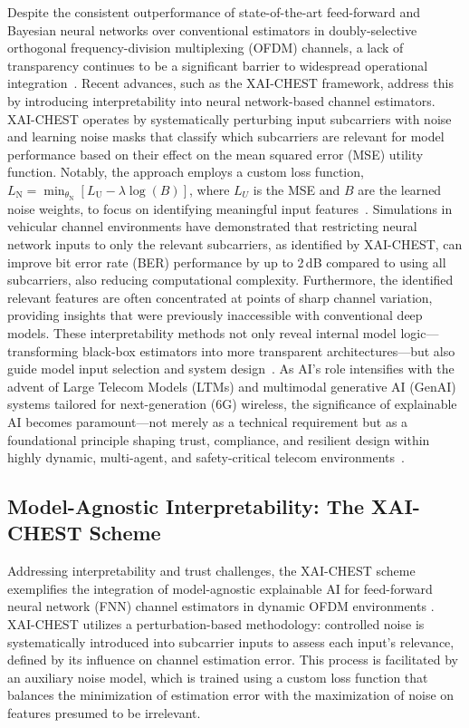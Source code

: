 \documentclass[sigconf]{acmart}
\begin{document}
Despite the consistent outperformance of state-of-the-art feed-forward and Bayesian neural networks over conventional estimators in doubly-selective orthogonal frequency-division multiplexing (OFDM) channels, a lack of transparency continues to be a significant barrier to widespread operational integration~\cite{ref38}. Recent advances, such as the XAI-CHEST framework, address this by introducing interpretability into neural network-based channel estimators. XAI-CHEST operates by systematically perturbing input subcarriers with noise and learning noise masks that classify which subcarriers are relevant for model performance based on their effect on the mean squared error (MSE) utility function. Notably, the approach employs a custom loss function, $L_\mathrm{N} = \min_{\theta_\mathrm{N}} [L_\mathrm{U} - \lambda \log(B)]$, where $L_U$ is the MSE and $B$ are the learned noise weights, to focus on identifying meaningful input features~\cite{ref38,ref41}. Simulations in vehicular channel environments have demonstrated that restricting neural network inputs to only the relevant subcarriers, as identified by XAI-CHEST, can improve bit error rate (BER) performance by up to 2\,dB compared to using all subcarriers, also reducing computational complexity. Furthermore, the identified relevant features are often concentrated at points of sharp channel variation, providing insights that were previously inaccessible with conventional deep models. These interpretability methods not only reveal internal model logic—transforming black-box estimators into more transparent architectures—but also guide model input selection and system design~\cite{ref38,ref41}. As AI's role intensifies with the advent of Large Telecom Models (LTMs) and multimodal generative AI (GenAI) systems tailored for next-generation (6G) wireless, the significance of explainable AI becomes paramount—not merely as a technical requirement but as a foundational principle shaping trust, compliance, and resilient design within highly dynamic, multi-agent, and safety-critical telecom environments~\cite{ref41}.

\subsection{Model-Agnostic Interpretability: The XAI-CHEST Scheme}

Addressing interpretability and trust challenges, the XAI-CHEST scheme exemplifies the integration of model-agnostic explainable AI for feed-forward neural network (FNN) channel estimators in dynamic OFDM environments \cite{ref38,ref41}. XAI-CHEST utilizes a perturbation-based methodology: controlled noise is systematically introduced into subcarrier inputs to assess each input’s relevance, defined by its influence on channel estimation error. This process is facilitated by an auxiliary noise model, which is trained using a custom loss function that balances the minimization of estimation error with the maximization of noise on features presumed to be irrelevant. 
\end{document}
